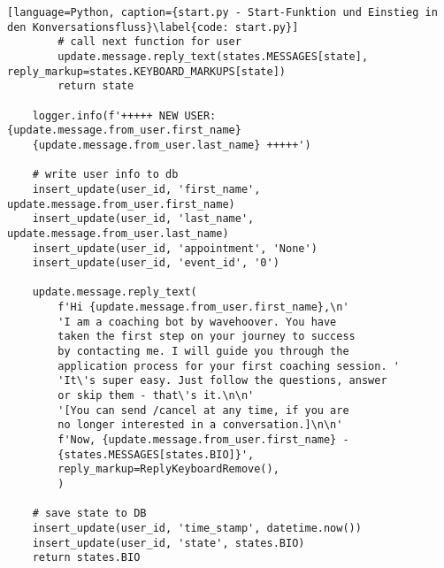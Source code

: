 \begin{lstlisting}[language=Python, caption={start.py - Start-Funktion und Einstieg in den Konversationsfluss}\label{code: start.py}]
        # call next function for user
        update.message.reply_text(states.MESSAGES[state], reply_markup=states.KEYBOARD_MARKUPS[state])
        return state

    logger.info(f'+++++ NEW USER: {update.message.from_user.first_name} 
    {update.message.from_user.last_name} +++++')

    # write user info to db
    insert_update(user_id, 'first_name', update.message.from_user.first_name) 
    insert_update(user_id, 'last_name', update.message.from_user.last_name)
    insert_update(user_id, 'appointment', 'None')
    insert_update(user_id, 'event_id', '0')

    update.message.reply_text(
        f'Hi {update.message.from_user.first_name},\n'
        'I am a coaching bot by wavehoover. You have 
        taken the first step on your journey to success 
        by contacting me. I will guide you through the 
        application process for your first coaching session. '
        'It\'s super easy. Just follow the questions, answer 
        or skip them - that\'s it.\n\n'
        '[You can send /cancel at any time, if you are 
        no longer interested in a conversation.]\n\n'
        f'Now, {update.message.from_user.first_name} - 
        {states.MESSAGES[states.BIO]}',
        reply_markup=ReplyKeyboardRemove(),
        )

    # save state to DB
    insert_update(user_id, 'time_stamp', datetime.now())
    insert_update(user_id, 'state', states.BIO)
    return states.BIO
        \end{lstlisting}

